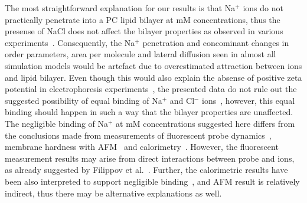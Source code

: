 \documentclass[pre,aps,floatfix,authordate1-4,twocolumn]{revtex4-1}
\begin{document}



The most straightforward explanation for our results is that Na$^+$ ions do not practically penetrate into a PC lipid bilayer
at mM concentrations, thus the presense of NaCl does not affect the bilayer properties as observed in various 
experiments~\cite{akutsu81,altenbach84,clarke99,binder02,pabst07,filippov09}.
Consequently, the Na$^+$ penetration and concominant changes in order parameters, area per molecule and lateral diffusion 
seen in almost all simulation models would be artefact due to overestimated attraction between ions and lipid bilayer.
Even though this would also explain the absense of positive zeta potential in electrophoresis 
experiments~\cite{eisenberg79,tatulian87,manyes05,manyes06,klasczyk10},  
the presented data do not rule out the suggested possibility of equal binding of Na$^+$ and Cl$^-$ ions~\cite{knecht13},
however, this equal binding should happen in such a way that the bilayer properties are unaffected.
The negligible binding of Na$^+$ at mM concentrations suggested here differs from the conclusions made from 
measurements of fluorescent probe dynamics~\cite{bockmann03,vacha09a,harb13}, membrane hardness with 
AFM~\cite{manyes05,manyes06,fukuma07,ferber11,morata12} and calorimetry~\cite{bockmann03,klasczyk10}.
However, the fluorescent measurement results may arise from direct interactions between probe and ions, as already 
suggested by Filippov et al.~\cite{filippov09}. 
Further, the calorimetric results have been also interpreted to support negligible binding~\cite{cevc90}, 
and AFM result is relatively indirect, thus there may be alternative explanations as well.
\end{document}
